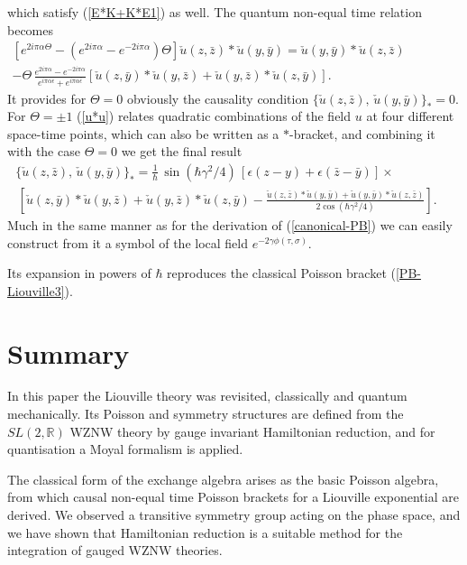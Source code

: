 \documentclass[a4paper,12pt]{article}
\newcommand{\rr}{\mathbb{R}}
\begin{document}
which satisfy (\ref{E*K+K*E1}) as well.
The quantum non-equal time relation  becomes
\begin{eqnarray}\label{u*u}
\left[e^{2i\pi\alpha\Theta}-
\left(e^{2i\pi\alpha}-e^{-2i\pi\alpha}\right)\Theta \right]
\check u(z,\bar z)*\check u(y,\bar y)=
\check u(y,\bar y)*\check u(z,\bar z)~~~~~~~~~~~~~~~~~~~~~~~~\\ \nonumber
-\Theta\,\frac{e^{2i\pi\alpha}-e^{-2i\pi\alpha}}{e^{i\pi\alpha\epsilon}+
e^{i\pi\alpha\bar\epsilon}}
[\check u(z,\bar y)*\check u(y,\bar z)+
\check u(y,\bar z)*\check u(z,\bar y)].
\end{eqnarray}
It provides for $\Theta =0$  obviously the causality condition
$\{\check u(z,\bar z),\,\check u(y,\bar y)\}_*=0$.
For $\Theta =\pm 1$ (\ref{u*u}) relates quadratic combinations
of the field $u$  at  four different space-time points,
which can also be written as a $*$-bracket, and combining it
with the case $\Theta=0$ we get the final result
\begin{eqnarray}\label{u*u!}
\{\check u(z,\bar z),\,\check u(y,\bar y)\}_*=
\frac{1}{\hbar}\,\sin(\hbar\gamma^2/4)\,
[\epsilon(z-y)+\epsilon(\bar z-\bar y)]\times
~~~~~~~~~~~~~~~~~~~~~
\\ \nonumber
\,\left[\check u(z, \bar y) * \check u(y, \bar z) +\check u(y, \bar z)*
\check u(z, \bar y)-
\frac{\check u(z, \bar z)* \check u(y, \bar y)+\check u(y, \bar y)*
\check u(z, \bar z)}{2\cos(\hbar\gamma^2/4)}
\right].
\end{eqnarray}
Much in the same manner as for the derivation of (\ref{canonical-PB})
we can easily construct from it a symbol of the local field
$e^{-2\gamma\phi(\tau,\sigma)}$.

\noindent
Its expansion in powers of $\hbar$ reproduces the classical
Poisson bracket (\ref{PB-Liouville3}).


\section{Summary}
In this paper the Liouville theory was revisited, classically and
quantum mechanically. Its Poisson and symmetry structures are defined
from the $SL(2,\rr)$ WZNW theory by gauge invariant Hamiltonian
reduction, and for quantisation a Moyal formalism is applied.

\noindent
The classical form of the exchange algebra arises as the basic Poisson
algebra, from which causal non-equal time Poisson brackets for a
Liouville exponential are derived.  We observed a transitive symmetry
group acting on the phase space, and we have shown that Hamiltonian
reduction is a suitable method for the integration of gauged WZNW
theories.
\end{document}

